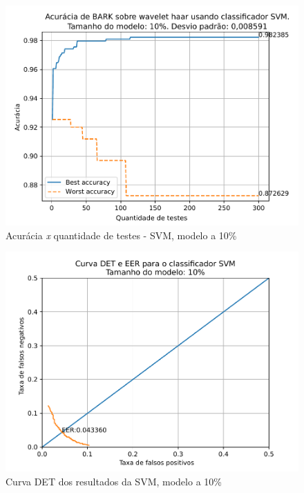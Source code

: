 			\begin{figure}[H]
				\centering
				\includegraphics[width=.9\linewidth]{images/results/confusionMatrices/classifier_SVM_10}
				\caption{Acurácia \textit{x} quantidade de testes - SVM, modelo a 10\%}
				\label{fig:classifiersvm10}
			\end{figure}
		
			\begin{figure}[H]
				\centering
				\includegraphics[width=.9\linewidth]{images/results/det/DET_for_classifier_SVM_10}
				\caption{Curva DET dos resultados da SVM, modelo a 10\%}
				\label{fig:detsvm10}
			\end{figure}


